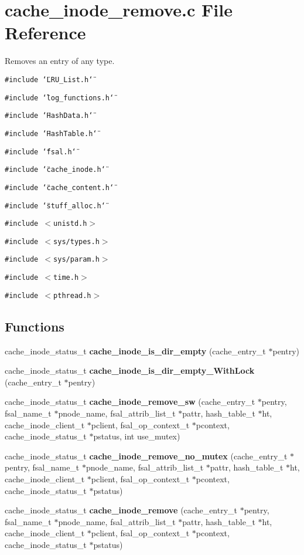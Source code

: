 \section{cache\_\-inode\_\-remove.c File Reference}
\label{cache__inode__remove_8c}
Removes an entry of any type. 

{\tt \#include \char`\"{}LRU\_\-List.h\char`\"{}}\par
{\tt \#include \char`\"{}log\_\-functions.h\char`\"{}}\par
{\tt \#include \char`\"{}Hash\-Data.h\char`\"{}}\par
{\tt \#include \char`\"{}Hash\-Table.h\char`\"{}}\par
{\tt \#include \char`\"{}fsal.h\char`\"{}}\par
{\tt \#include \char`\"{}cache\_\-inode.h\char`\"{}}\par
{\tt \#include \char`\"{}cache\_\-content.h\char`\"{}}\par
{\tt \#include \char`\"{}stuff\_\-alloc.h\char`\"{}}\par
{\tt \#include $<$unistd.h$>$}\par
{\tt \#include $<$sys/types.h$>$}\par
{\tt \#include $<$sys/param.h$>$}\par
{\tt \#include $<$time.h$>$}\par
{\tt \#include $<$pthread.h$>$}\par
\subsection*{Functions}
\begin{CompactItemize}
\item 
cache\_\-inode\_\-status\_\-t {\bf cache\_\-inode\_\-is\_\-dir\_\-empty} (cache\_\-entry\_\-t $\ast$pentry)
\item 
cache\_\-inode\_\-status\_\-t {\bf cache\_\-inode\_\-is\_\-dir\_\-empty\_\-With\-Lock} (cache\_\-entry\_\-t $\ast$pentry)
\item 
cache\_\-inode\_\-status\_\-t {\bf cache\_\-inode\_\-remove\_\-sw} (cache\_\-entry\_\-t $\ast$pentry, fsal\_\-name\_\-t $\ast$pnode\_\-name, fsal\_\-attrib\_\-list\_\-t $\ast$pattr, hash\_\-table\_\-t $\ast$ht, cache\_\-inode\_\-client\_\-t $\ast$pclient, fsal\_\-op\_\-context\_\-t $\ast$pcontext, cache\_\-inode\_\-status\_\-t $\ast$pstatus, int use\_\-mutex)
\item 
cache\_\-inode\_\-status\_\-t {\bf cache\_\-inode\_\-remove\_\-no\_\-mutex} (cache\_\-entry\_\-t $\ast$pentry, fsal\_\-name\_\-t $\ast$pnode\_\-name, fsal\_\-attrib\_\-list\_\-t $\ast$pattr, hash\_\-table\_\-t $\ast$ht, cache\_\-inode\_\-client\_\-t $\ast$pclient, fsal\_\-op\_\-context\_\-t $\ast$pcontext, cache\_\-inode\_\-status\_\-t $\ast$pstatus)
\item 
cache\_\-inode\_\-status\_\-t {\bf cache\_\-inode\_\-remove} (cache\_\-entry\_\-t $\ast$pentry, fsal\_\-name\_\-t $\ast$pnode\_\-name, fsal\_\-attrib\_\-list\_\-t $\ast$pattr, hash\_\-table\_\-t $\ast$ht, cache\_\-inode\_\-client\_\-t $\ast$pclient, fsal\_\-op\_\-context\_\-t $\ast$pcontext, cache\_\-inode\_\-status\_\-t $\ast$pstatus)
\end{CompactItemize}


